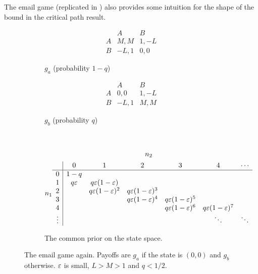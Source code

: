 \documentclass[11pt,letterpaper,reqno,oneside]{article}
\begin{document}
The email game (replicated in ) also provides some intuition for the shape of the bound in the critical path result.
%
\begin{figure}
	\begin{subfigure}{0.5\textwidth}
		\begin{equation*}
			\begin{array}{c|cc}
					& A		& B		\\ \hline
				A	& M,M	& 1,-L	\\
				B	& -L,1	& 0,0	
			\end{array}
		\end{equation*}
		\caption{$g_a$ (probability $1-q$)}
	\end{subfigure}
	\begin{subfigure}{0.5\textwidth}
		\begin{equation*}
			\begin{array}{c|cc}
					& A		& B		\\ \hline
				A	& 0,0	& 1,-L	\\
				B	& -L,1	& M,M	
			\end{array}
		\end{equation*}
		\caption{$g_b$ (probability $q$)}
	\end{subfigure}
	\\
	\begin{subfigure}{\textwidth}
		\begin{gather*}
			n_2\\n_1
			\begin{array}{c|ccccccc}
						& 0			& 1					& 2					& 3					& 4					& \cdots	\\ \hline
				0		& 1-q		& 					& 					& 					& 					& 			\\
				1		& q \varepsilon	& q \varepsilon(1-\varepsilon)	& 					& 					& 					& 			\\
				2		& 			& q \varepsilon(1-\varepsilon)^2	& q \varepsilon(1-\varepsilon)^3	& 					& 					& 			\\
				3		& 			& 					& q \varepsilon(1-\varepsilon)^4	& q \varepsilon(1-\varepsilon)^5	& 					& 			\\
				4		& 			& 					& 					& q \varepsilon(1-\varepsilon)^6	& q \varepsilon(1-\varepsilon)^7	& 			\\
				\vdots	& 			& 					& 					& 					& \ddots			& \ddots
			\end{array}
		\end{gather*}
		\caption{The common prior on the state space.}
	\end{subfigure}
	\caption{The email game again. Payoffs are $g_a$ if the state is $(0,0)$ and $g_b$ otherwise. $\varepsilon$ is small, $L>M>1$ and $q<1/2$.}
	\label{fig:email_game_recapcap}
\end{figure}
\end{document}
